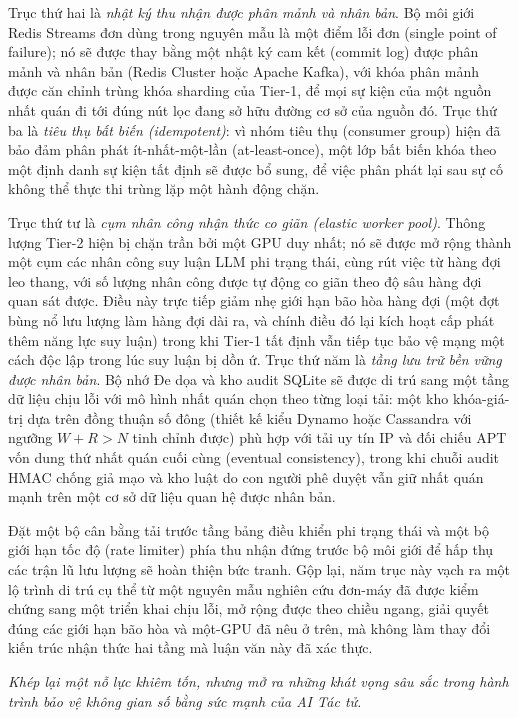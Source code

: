 Trục thứ hai là \textit{nhật ký thu nhận được phân mảnh và nhân bản}. Bộ môi giới Redis Streams đơn dùng trong nguyên mẫu là một điểm lỗi đơn (single point of failure); nó sẽ được thay bằng một nhật ký cam kết (commit log) được phân mảnh và nhân bản (Redis Cluster hoặc Apache Kafka), với khóa phân mảnh được căn chỉnh trùng khóa sharding của Tier-1, để mọi sự kiện của một nguồn nhất quán đi tới đúng nút lọc đang sở hữu đường cơ sở của nguồn đó. Trục thứ ba là \textit{tiêu thụ bất biến (idempotent)}: vì nhóm tiêu thụ (consumer group) hiện đã bảo đảm phân phát ít-nhất-một-lần (at-least-once), một lớp bất biến khóa theo một định danh sự kiện tất định sẽ được bổ sung, để việc phân phát lại sau sự cố không thể thực thi trùng lặp một hành động chặn.

Trục thứ tư là \textit{cụm nhân công nhận thức co giãn (elastic worker pool)}. Thông lượng Tier-2 hiện bị chặn trần bởi một GPU duy nhất; nó sẽ được mở rộng thành một cụm các nhân công suy luận LLM phi trạng thái, cùng rút việc từ hàng đợi leo thang, với số lượng nhân công được tự động co giãn theo độ sâu hàng đợi quan sát được. Điều này trực tiếp giảm nhẹ giới hạn bão hòa hàng đợi (một đợt bùng nổ lưu lượng làm hàng đợi dài ra, và chính điều đó lại kích hoạt cấp phát thêm năng lực suy luận) trong khi Tier-1 tất định vẫn tiếp tục bảo vệ mạng một cách độc lập trong lúc suy luận bị dồn ứ. Trục thứ năm là \textit{tầng lưu trữ bền vững được nhân bản}. Bộ nhớ Đe dọa và kho audit SQLite sẽ được di trú sang một tầng dữ liệu chịu lỗi với mô hình nhất quán chọn theo từng loại tải: một kho khóa-giá-trị dựa trên đồng thuận số đông (thiết kế kiểu Dynamo hoặc Cassandra với ngưỡng $W+R>N$ tinh chỉnh được) phù hợp với tải uy tín IP và đối chiếu APT vốn dung thứ nhất quán cuối cùng (eventual consistency), trong khi chuỗi audit HMAC chống giả mạo và kho luật do con người phê duyệt vẫn giữ nhất quán mạnh trên một cơ sở dữ liệu quan hệ được nhân bản.

Đặt một bộ cân bằng tải trước tầng bảng điều khiển phi trạng thái và một bộ giới hạn tốc độ (rate limiter) phía thu nhận đứng trước bộ môi giới để hấp thụ các trận lũ lưu lượng sẽ hoàn thiện bức tranh. Gộp lại, năm trục này vạch ra một lộ trình di trú cụ thể từ một nguyên mẫu nghiên cứu đơn-máy đã được kiểm chứng sang một triển khai chịu lỗi, mở rộng được theo chiều ngang, giải quyết đúng các giới hạn bão hòa và một-GPU đã nêu ở trên, mà không làm thay đổi kiến trúc nhận thức hai tầng mà luận văn này đã xác thực.

\vspace{1cm}
\begin{flushright}
    \textit{Khép lại một nỗ lực khiêm tốn, nhưng mở ra những khát vọng sâu sắc trong hành trình bảo vệ không gian số bằng sức mạnh của AI Tác tử.}
\end{flushright}
